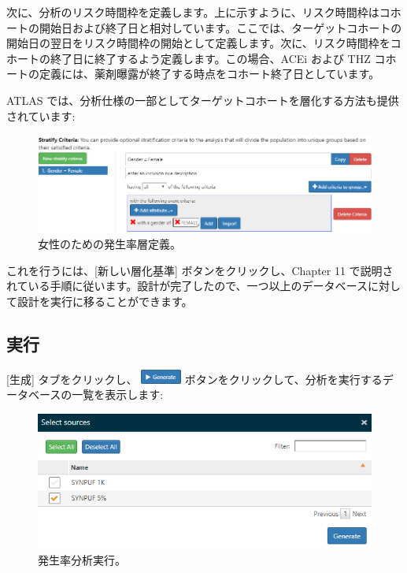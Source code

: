 \documentclass[
  11pt]{book}
\theoremstyle{definition}
\theoremstyle{definition}
\theoremstyle{definition}
\theoremstyle{definition}
\theoremstyle{remark}
\begin{document}
次に、分析のリスク時間枠を定義します。上に示すように、リスク時間枠はコホートの開始日および終了日と相対しています。ここでは、ターゲットコホートの開始日の翌日をリスク時間枠の開始として定義します。次に、リスク時間枠をコホートの終了日に終了するよう定義します。この場合、ACEi および THZ コホートの定義には、薬剤曝露が終了する時点をコホート終了日としています。

ATLAS では、分析仕様の一部としてターゲットコホートを層化する方法も提供されています:

\begin{figure}

{\centering \includegraphics[width=1\linewidth]{images/Characterization/atlasIncidenceStratifyFemale} 

}

\caption{女性のための発生率層定義。}\label{fig:atlasIncidenceStratifyFemale}
\end{figure}

これを行うには、{[}新しい層化基準{]} ボタンをクリックし、Chapter 11 で説明されている手順に従います。設計が完了したので、一つ以上のデータベースに対して設計を実行に移ることができます。

\subsection{実行}\label{ux5b9fux884c-2}

{[}生成{]} タブをクリックし、 \includegraphics{images/Characterization/atlasIncidenceGenerate.png} ボタンをクリックして、分析を実行するデータベースの一覧を表示します:

\begin{figure}

{\centering \includegraphics[width=1\linewidth]{images/Characterization/atlasIncidenceSourceSelection} 

}

\caption{発生率分析実行。}\label{fig:atlasIncidenceSourceSelection}
\end{figure}
\end{document}
